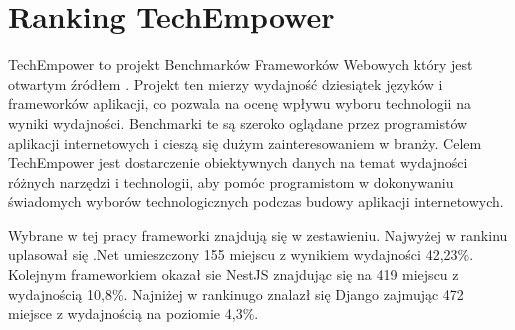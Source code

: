 \section{Ranking TechEmpower}

TechEmpower to projekt Benchmarków Frameworków Webowych który jest otwartym źródłem \cite{techempower}.
Projekt ten mierzy wydajność dziesiątek języków i frameworków aplikacji, co pozwala na ocenę wpływu wyboru technologii na wyniki wydajności.
Benchmarki te są szeroko oglądane przez programistów aplikacji internetowych i cieszą się dużym zainteresowaniem w branży.
Celem TechEmpower jest dostarczenie obiektywnych danych na temat wydajności różnych narzędzi i technologii, aby pomóc programistom w dokonywaniu świadomych wyborów technologicznych podczas budowy aplikacji internetowych.

Wybrane w tej pracy frameworki znajdują się w zestawieniu.
Najwyżej w rankinu uplasował się .Net umieszczony 155 miejscu z wynikiem wydajności 42,23\%.
Kolejnym frameworkiem okazał sie NestJS znajdując się na 419 miejscu z wydajnością 10,8\%.
Najniżej w rankinugo znalazł się Django zajmując 472 miejsce z wydajnością na poziomie 4,3\%. 